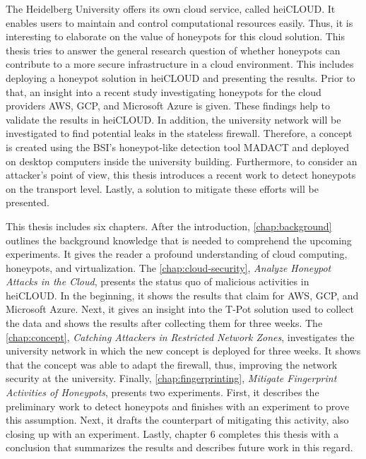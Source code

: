 The Heidelberg University offers its own cloud service, called heiCLOUD.
It enables users to maintain and control computational resources easily. 
Thus, it is interesting to elaborate on the value of honeypots for this cloud solution.
This thesis tries to answer the general research question of whether honeypots can contribute to a more secure infrastructure in a cloud environment.
This includes deploying a honeypot solution in heiCLOUD and presenting the results.
Prior to that, an insight into a recent study investigating honeypots for the cloud providers AWS, GCP, and Microsoft Azure is given.
These findings help to validate the results in heiCLOUD.
In addition, the university network will be investigated to find potential leaks in the stateless firewall.
Therefore, a concept is created using the BSI's honeypot-like detection tool MADACT and deployed on desktop computers inside the university building.
Furthermore, to consider an attacker's point of view, this thesis introduces a recent work to detect honeypots on the transport level.
Lastly, a solution to mitigate these efforts will be presented.

This thesis includes six chapters.
After the introduction, \autoref{chap:background} outlines the background knowledge that is needed to comprehend the upcoming experiments.
It gives the reader a profound understanding of cloud computing, honeypots, and virtualization.
The \autoref{chap:cloud-security}, \textit{Analyze Honeypot Attacks in the Cloud}, presents the status quo of malicious activities in heiCLOUD.
In the beginning, it shows the results that \citet{Kelly2021} claim for AWS, GCP, and Microsoft Azure.
Next, it gives an insight into the T-Pot solution used to collect the data and shows the results after collecting them for three weeks.
The \autoref{chap:concept}, \textit{Catching Attackers in Restricted Network Zones}, investigates the university network in which the new concept is deployed for three weeks.
It shows that the concept was able to adapt the firewall, thus, improving the network security at the university.
Finally, \autoref{chap:fingerprinting}, \textit{Mitigate Fingerprint Activities of Honeypots}, presents two experiments.
First, it describes the preliminary work to detect honeypots and finishes with an experiment to prove this assumption.
Next, it drafts the counterpart of mitigating this activity, also closing up with an experiment.
Lastly, chapter 6 completes this thesis with a conclusion that summarizes the results and describes future work in this regard.

